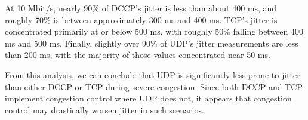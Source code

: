 At 10 Mbit/s, nearly 90\% of DCCP's jitter is less than about 400 ms, and
roughly 70\% is between approximately 300 ms and 400 ms. TCP's jitter is
concentrated primarily at or below 500 ms, with roughly 50\% falling between 400
ms and 500 ms. Finally, slightly over 90\% of UDP's jitter measurements are less
than 200 ms, with the majority of those values concentrated near 50 ms.

From this analysis, we can conclude that UDP is significantly less prone to
jitter than either DCCP or TCP during severe congestion. Since both DCCP and TCP
implement congestion control where UDP does not, it appears that congestion
control may drastically worsen jitter in such scenarios.

